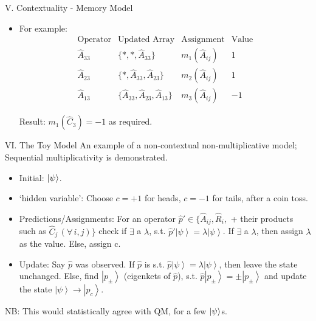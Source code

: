 \documentclass[final,hyperref={pdfpagelabels=false}]{beamer}
\begin{document}
\begin{frame}[t]
\begin{columns}[c]
\begin{column}{.69\textwidth}
\begin{columns}[b]
\begin{column}{.48\textwidth}
\begin{block}{V. Contextuality - Memory Model}
\begin{itemize}
              \item For example:
                \[
                \begin{array}{c|ccc}
                  \text{Operator} & \text{Updated Array} & \text{Assignment} & \text{Value}\\
                  \hat {A}_{33} & \{*,*,\hat{A}_{33}\} & m_1(\hat A_{ij}) & 1\\
                  \hat {A}_{23} & \{*,\hat{A}_{33},\hat{A}_{23}\} & m_2(\hat A_{ij}) & 1\\
                  \hat {A}_{13} & \{\hat{A}_{33},\hat{A}_{23},\hat {A}_{13}\} & m_3(\hat A_{ij}) & -1
                \end{array}
                \]

                Result: $m_1(\hat C_3)=-1$ as required.
              \end{itemize}
          \end{block}

          \begin{block}{VI. The Toy Model}
            An example of a non-contextual non-multiplicative model; Sequential multiplicativity is demonstrated.
            \begin{itemize}
              \item Initial: $\ket {\psi}$.
              \item `hidden variable': Choose $c=+1$ for heads, $c=-1$ for tails, after a coin toss.
              \item Predictions/Assignments: For an operator $\hat{p}'\in\{\hat{A}_{ij},\hat{R}_{i},$ + their products such as $\hat{C}_{j}\,(\forall\,i,j)\}$  check if $\exists$ a $\lambda$, s.t. $\hat{p}'\left|\psi\right\rangle =\lambda\left|\psi\right\rangle$. If $\exists$ a $\lambda$, then assign $\lambda$ as the value. Else, assign c.
              \item Update: Say $\hat{p}$ was observed. If $\hat{p}$ is s.t. $\hat{p}\left|\psi\right\rangle =\lambda\left|\psi\right\rangle$, then leave the state unchanged. Else, find $\left|p_{\pm}\right\rangle$   (eigenkets of $\hat{p}$), s.t. $\hat{p}\left|p_{\pm}\right\rangle =\pm\left|p_{\pm}\right\rangle$ and update the state $\left|\psi\right\rangle \to\left|p_{c}\right\rangle$. 
            \end{itemize}
            NB: This would statistically agree with QM, for a few $\ket{\psi}$s.
          \end{block}


\end{column}
\end{columns}
\end{column}
\end{columns}
\end{frame}
\end{document}
